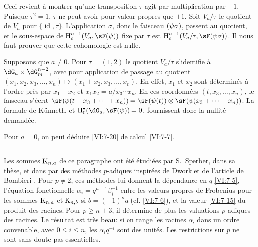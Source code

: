 Ceci revient \`a montrer qu'une transposition $\tau$ agit par multiplication 
par $-1$. Puisque $\tau^2=1$, $\tau$ ne peut avoir pour valeur propres que 
$\pm 1$. Soit $V_a/\tau$ le quotient de $V_a$ pour 
$\{\operatorname{id},\tau\}$. L'application $\sigma$, donc le faisceau 
$\sf(\psi\sigma)$, passent au quotient, et le sous-espace de 
$\h_c^{n-1}(V_a,\sF(\psi))$ fixe par 
$\tau$ est $\h_c^{n-1}(V_a/\tau,\sF(\psi\sigma))$. Il nous faut prouver que 
cette cohomologie est nulle. 

Supposons que $a\ne 0$. Pour $\tau=(1,2)$ le quotient $V_a/\tau$ s'identifie 
\`a $\dG_a\times \dG_m^{n-2}$, avec pour application de passage au quotient 
$(x_1,x_2,x_3,\dots,x_n)\mapsto (x_1+x_2,x_3,\dots,x_n)$. En effet, $x_1$ et 
$x_2$ sont d\'etermin\'es \`a l'ordre pr\`es par $x_1+x_2$ et 
$x_1x_2 = a/x_3\dotsm x_n$. En ces coordonn\'ees $(t,x_3,\dots,x_n)$, le 
faisceau s'\'ecrit 
$\sF(\psi(t+x_3+\cdots + x_n)) = \sF(\psi(t))\otimes \sF(\psi(x_3+\cdots + x_n))$. 
La formule de K\"unneth, et $\h_0^\bullet(\dG_a,\sF(\psi)) = 0$, fournissent 
donc la nullit\'e demand\'ee. 

Pour $a=0$, on peut d\'eduire \ref{VI:7-20} de calcul \ref{VI:7-7}. 





\subsection{}\label{VI:7-21}

Les sommes $\textnormal{K}_{n,a}$ de ce paragraphe ont \'et\'e \'etudi\'ees par 
S.\ Sperber, dans sa th\`ese, et dans \cite{sp77} par des m\'ethodes 
$p$-adiques inspir\'ees de Dwork et de l'article de Bombieri \cite{bo66}. 
Pour $p\ne 2$, ces m\'ethodes lui donnent la d\'ependance en $q$ \ref{VI:7-5}, 
l'\'equation fonctionnelle $\alpha_i = q^{n-1} \beta_i^{-1}$ entre les 
valeurs propres de Frobenius pour les sommes $\textnormal{K}_{n,a}$ et 
$\textnormal{K}_{n,b}$ si $b=(-1)^n a$ (cf. \ref{VI:7-6}), et la valeur \ref{VI:7-15} 
du produit des racines. Pour $p\geqslant n+3$, il d\'etermine de plus les 
valuations $p$-adiques des racines. Le r\'esultat est tr\`es beau: si on range 
les racines $\alpha_i$ dans un ordre convenable, avec 
$0\leqslant i\leqslant n$, les $\alpha_i q^{-i}$ sont des unit\'es. Les 
restrictions sur $p$ ne sont sans doute pas essentielles. 










